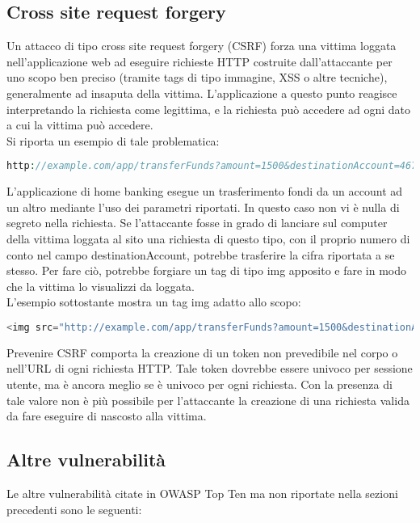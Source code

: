 \subsection{Cross site request forgery}
Un attacco di tipo cross site request forgery (CSRF) forza una vittima loggata nell'applicazione web ad eseguire richieste HTTP costruite dall'attaccante per uno scopo ben preciso (tramite tags di tipo immagine, XSS o altre tecniche), generalmente ad insaputa della vittima. L'applicazione a questo punto reagisce interpretando la richiesta come legittima, e la richiesta può accedere ad ogni dato a cui la vittima può accedere.\\
Si riporta un esempio di tale problematica:

\begin{lstlisting}[language=PHP]
http://example.com/app/transferFunds?amount=1500&destinationAccount=4673243243
\end{lstlisting}

L'applicazione di home banking esegue un trasferimento fondi da un account ad un altro mediante l'uso dei parametri riportati. In questo caso non vi è nulla di segreto nella richiesta. Se l'attaccante fosse in grado di lanciare sul computer della vittima loggata al sito una richiesta di questo tipo, con il proprio numero di conto nel campo destinationAccount, potrebbe trasferire la cifra riportata a se stesso. Per fare ciò, potrebbe forgiare un tag di tipo img apposito e fare in modo che la vittima lo visualizzi da loggata.\\
L'esempio sottostante mostra un tag img adatto allo scopo:

\begin{lstlisting}[language=PHP]
<img src="http://example.com/app/transferFunds?amount=1500&destinationAccount=attackersAcct#" width="0" height="0" />
\end{lstlisting}

Prevenire CSRF comporta la creazione di un token non prevedibile nel corpo o nell'URL di ogni richiesta HTTP. Tale token dovrebbe essere univoco per sessione utente, ma è ancora meglio se è univoco per ogni richiesta. Con la presenza di tale valore non è più possibile per l'attaccante la creazione di una richiesta valida da fare eseguire di nascosto alla vittima.

\subsection{Altre vulnerabilità}
Le altre vulnerabilità citate in OWASP Top Ten ma non riportate nella sezioni precedenti sono le seguenti:


